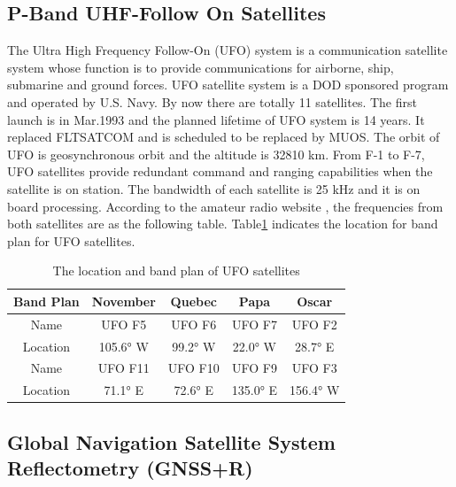 \documentclass[draftcls]{IEEEtran}
\begin{document}


\subsection{P-Band UHF-Follow On Satellites}
The Ultra High Frequency Follow-On (UFO) system is a communication satellite system whose function is to provide communications for airborne, ship, submarine and ground forces. UFO satellite system is a DOD sponsored program and operated by U.S. Navy. By now there are totally 11 satellites. The first launch is in Mar.1993 and the planned lifetime of UFO system is 14 years. It replaced FLTSATCOM and is scheduled to be replaced by MUOS. The orbit of UFO is geosynchronous orbit and the altitude is 32810 km. From F-1 to F-7, UFO satellites provide redundant command and ranging capabilities when the satellite is on station. The bandwidth of each satellite is 25 kHz and it is on board processing. According to the amateur radio website \cite{Matt:2014}, the frequencies from both satellites are as the following table. Table\ref{Table Band Plan} indicates the location for band plan for UFO satellites.

\begin{table}[ht]
\centering
\begin{tabular}  {|c|c|c|c|c|}
	\hline
     \textbf{Band Plan} & \textbf{November}	& \textbf{Quebec} &	\textbf{Papa} & \textbf{Oscar} \\
    \hline
    Name & UFO F5 & UFO F6 & UFO F7 & UFO F2 \\
    \hline
     Location &	105.6° W & 99.2° W & 	22.0° W	&  28.7° E\\
    \hline
    Name & UFO F11 & UFO F10 & UFO F9  & UFO F3 \\
    \hline
    Location& 71.1° E &	72.6° E &	135.0° E &	156.4° W \\
    \hline
\end{tabular}
\caption{The location and band plan of UFO satellites}
\label{Table Band Plan}
\end{table}

\subsection{Global Navigation Satellite System  Reflectometry (GNSS+R)}
\end{document}
